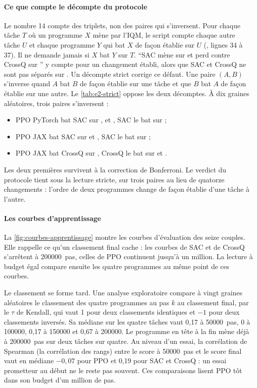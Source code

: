 \paragraph{Ce que compte le décompte du protocole}
Le nombre 14 compte des triplets, non des paires qui s'inversent. Pour chaque tâche $T$ où un programme $X$
mène par l'IQM, le script compte chaque autre tâche $U$ et chaque programme $Y$ qui bat $X$ de façon
établie sur $U$ (, lignes 34 à 37). Il ne demande jamais si $X$ bat $Y$ sur $T$.
\enquote{SAC mène sur  et perd contre CrossQ sur } y compte pour un
changement établi, alors que SAC et CrossQ ne sont pas séparés sur . Un décompte strict corrige ce défaut. Une paire $(A, B)$ s'inverse quand $A$ bat $B$ de
façon établie sur une tâche et que $B$ bat $A$ de façon établie sur une autre. Le \cref{tab:e2-strict}
oppose les deux décomptes. À dix graines aléatoires, trois paires s'inversent :
\begin{itemize}
  \item PPO PyTorch bat SAC sur ,  et , SAC le bat sur
     ;
  \item PPO JAX bat SAC sur  et , SAC le bat sur  ;
  \item PPO JAX bat CrossQ sur , CrossQ le bat sur  et .
\end{itemize}
Les deux premières survivent à la correction de Bonferroni. Le verdict du protocole tient sous la lecture
stricte, sur trois paires au lieu de quatorze changements : l'ordre de deux programmes change de façon établie
d'une tâche à l'autre.


\paragraph{Les courbes d'apprentissage}
La \cref{fig:courbes-apprentissage} montre les courbes d'évaluation des seize couples. Elle rappelle ce qu'un
classement final cache : les courbes de SAC et de CrossQ s'arrêtent à \num{200000}~pas, celles de PPO
continuent jusqu'à un million. La lecture à budget égal compare ensuite les quatre programmes au même point de
ces courbes.

Le classement se forme tard. Une analyse exploratoire compare à vingt graines aléatoires le classement des quatre
programmes au pas $k$ au classement final, par le $\tau$ de Kendall, qui vaut 1 pour deux classements
identiques et $-1$ pour deux classements inversés. Sa médiane sur les quatre tâches vaut 0,17 à
\num{50000}~pas, 0 à \num{100000}, 0,17 à \num{150000} et 0,67 à \num{200000}. Le programme en tête à la
fin mène déjà à \num{200000}~pas sur deux tâches sur quatre. Au niveau d'un essai, la corrélation de Spearman
(la corrélation des rangs) entre le score à \num{50000}~pas et le score final vaut en médiane $-0{,}07$ pour PPO et 0,19 pour SAC et
CrossQ : un essai prometteur au début ne le reste pas souvent. Ces comparaisons lisent PPO tôt dans son
budget d'un million de pas.

